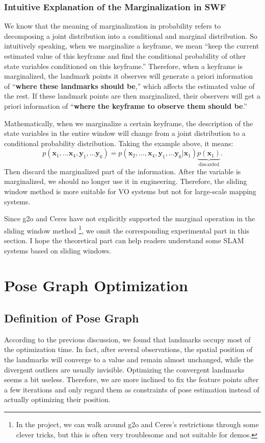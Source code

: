\subsubsection{Intuitive Explanation of the Marginalization in SWF}
We know that the meaning of marginalization in probability refers to decomposing a joint distribution into a conditional and marginal distribution. So intuitively speaking, when we marginalize a keyframe, we mean ``keep the current estimated value of this keyframe and find the conditional probability of other state variables conditioned on this keyframe.'' Therefore, when a keyframe is marginalized, the landmark points it observes will generate a priori information of ``\textbf{where these landmarks should be},'' which affects the estimated value of the rest. If these landmark points are then marginalized, their observers will get a priori information of ``\textbf{where the keyframe to observe them should be}.''

Mathematically, when we marginalize a certain keyframe, the description of the state variables in the entire window will change from a joint distribution to a conditional probability distribution. Taking the example above, it means:
\begin{equation}
	p\left( {{\bm{x}_1}, \ldots {\bm{x}_4},{\bm{y}_1}, \ldots {\bm{y}_6}} \right) = p\left( {{\bm{x}_2}, \ldots ,{\bm{x}_4},{\bm{y}_1}, \ldots {\bm{y}_6}|{\bm{x}_1}} \right)\underbrace {p\left( {{\bm{x}_1}} \right)}_{\text{discarded}}.
\end{equation}
Then discard the marginalized part of the information. After the variable is marginalized, we should no longer use it in engineering. Therefore, the sliding window method is more suitable for VO systems but not for large-scale mapping systems.

Since g2o and Ceres have not explicitly supported the marginal operation in the sliding window method \footnote{In the project, we can walk around g2o and Ceres's restrictions through some clever tricks, but this is often very troublesome and not suitable for demos. }, we omit the corresponding experimental part in this section. I hope the theoretical part can help readers understand some SLAM systems based on sliding windows.

\section{Pose Graph Optimization}
\subsection{Definition of Pose Graph}
According to the previous discussion, we found that landmarks occupy most of the optimization time. In fact, after several observations, the spatial position of the landmarks will converge to a value and remain almost unchanged, while the divergent outliers are usually invisible. Optimizing the convergent landmarks seems a bit useless. Therefore, we are more inclined to fix the feature points after a few iterations and only regard them as constraints of pose estimation instead of actually optimizing their position.

